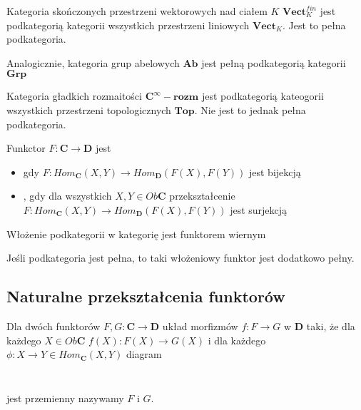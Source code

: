 \begin{example}
\item Kategoria skończonych przestrzeni wektorowych nad ciałem $K$ $\mathbf{Vect}_K^{fin}$ jest podkategorią kategorii wszystkich przestrzeni liniowych $\mathbf{Vect}_K$. Jest to pełna podkategoria.
\item Analogicznie, kategoria grup abelowych $\mathbf{Ab}$ jest pełną podkategorią kategorii $\mathbf{Grp}$
\item Kategoria gładkich rozmaitości $\mathbf{C^\infty-rozm}$ jest podkategorią kateogorii wszystkich przestrzeni topologicznych $\mathbf{Top}$. Nie jest to jednak pełna podkategoria.
\end{example}

\begin{definition}
  Funkctor $F:\mathbf{C}\to\mathbf{D}$ jest
  \begin{itemize}
    \item {} gdy $F:Hom_{\mathbf{C}}(X,Y)\to Hom_{\mathbf{D}}(F(X),F(Y))$ jest bijekcją
    \item {}, gdy dla wszystkich $X,Y\in Ob\mathbf{C}$ przekształcenie $F:Hom_{\mathbf{C}}(X,Y)\to Hom_{\mathbf{D}}(F(X),F(Y))$ jest surjekcją
  \end{itemize}
\end{definition}

\begin{example}
\item Włożenie podkategorii w kategorię jest funktorem wiernym
\item Jeśli podkategoria jest pełna, to taki włożeniowy funktor jest dodatkowo pełny.
\end{example}

\subsection{Naturalne przekształcenia funktorów}

\begin{definition}
  Dla dwóch funktorów $F, G:\mathbf{C}\to\mathbf{D}$ układ morfizmów $f:F\to G$ w $\mathbf{D}$ taki, że dla każdego $X\in Ob\mathbf{C}$ $f(X):F(X)\to G(X)$ i dla każdego $\phi:X\to Y\in Hom_{\mathbf{C}}(X, Y)$ diagram

  $ $

  \begin{center}
  \end{center}

  $ $

  jest przemienny nazywamy  $F$ i $G$.
\end{definition}

